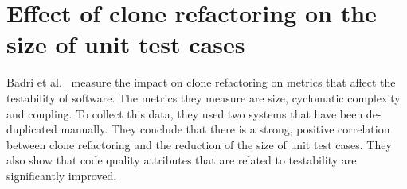 \section{Effect of clone refactoring on the size of unit test cases}
Badri et al.~\cite{badri2019measuring} measure the impact on clone refactoring on metrics that affect the testability of software. The metrics they measure are size, cyclomatic complexity and coupling. To collect this data, they used two systems that have been de-duplicated manually. They conclude that there is a strong, positive correlation between clone refactoring and the reduction of the size of unit test cases. They also show that code quality attributes that are related to testability are significantly improved.
